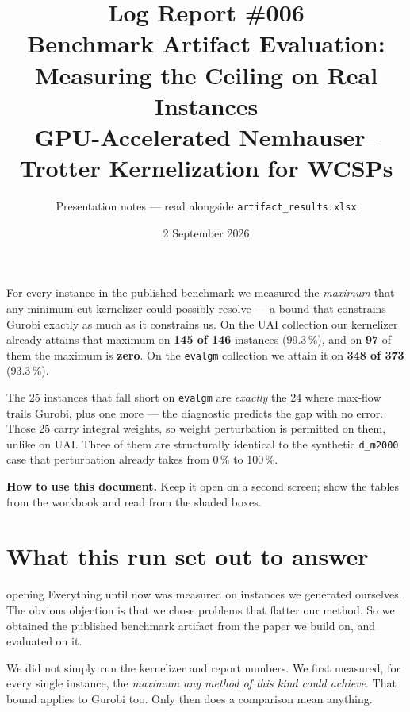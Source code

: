 \documentclass[11pt,a4paper]{article}
\title{\vspace{-1.4cm}\textbf{Log Report \#006}\\[2mm]
\large Benchmark Artifact Evaluation: Measuring the Ceiling on Real Instances\\[1mm]
\normalsize GPU-Accelerated Nemhauser--Trotter Kernelization for WCSPs}
\author{\normalsize Presentation notes --- read alongside \texttt{artifact\_results.xlsx}}
\date{\normalsize 2 September 2026}
\begin{document}
\maketitle
\thispagestyle{fancy}

\begin{tcolorbox}[colback=okgreen!8,colframe=okgreen,title=\textbf{THE RESULT}]
For every instance in the published benchmark we measured the \emph{maximum} that any minimum-cut
kernelizer could possibly resolve --- a bound that constrains Gurobi exactly as much as it
constrains us. On the UAI collection our kernelizer already attains that maximum on
\textbf{145 of 146} instances (99.3\,\%), and on \textbf{97} of them the maximum is \textbf{zero}.
On the \texttt{evalgm} collection we attain it on \textbf{348 of 373} (93.3\,\%).

The 25 instances that fall short on \texttt{evalgm} are \emph{exactly} the 24 where max-flow trails
Gurobi, plus one more --- the diagnostic predicts the gap with no error. Those 25 carry integral
weights, so weight perturbation is permitted on them, unlike on UAI. Three of them are structurally
identical to the synthetic \texttt{d\_m2000} case that perturbation already takes from 0\,\% to
100\,\%.
\end{tcolorbox}

\vspace{2mm}
\noindent\textbf{How to use this document.} Keep it open on a second screen; show the tables from
the workbook and read from the shaded boxes.

\tableofcontents

\section{What this run set out to answer}

\begin{say}{opening}
Everything until now was measured on instances we generated ourselves. The obvious objection is
that we chose problems that flatter our method. So we obtained the published benchmark artifact
from the paper we build on, and evaluated on it.

We did not simply run the kernelizer and report numbers. We first measured, for every single
instance, the \emph{maximum any method of this kind could achieve}. That bound applies to Gurobi
too. Only then does a comparison mean anything.
\end{say}
\end{document}
